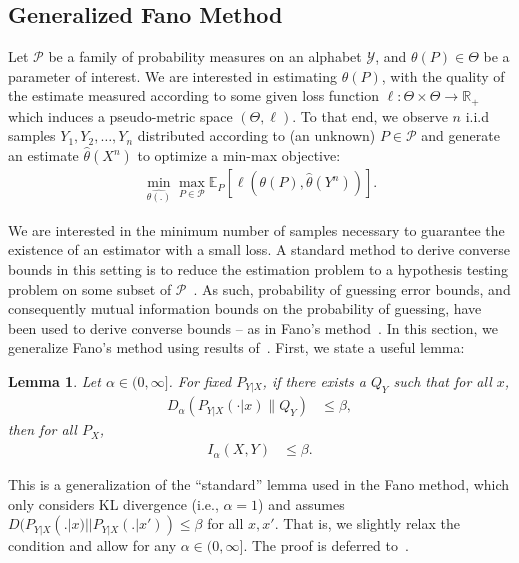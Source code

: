 \documentclass{article}
\numberwithin{theorem}{section}
\newtheorem{lemma}[theorem]{Lemma}
\numberwithin{example}{section}
\numberwithin{remark}{section}
\numberwithin{definition}{section}
\newcommand{\E}{\mathbb{E}}
\newcommand{\Y}{\mathcal{Y}}
\newcommand{\cP}{\mathcal{P}}
\begin{document}
 
\subsection{Generalized Fano Method}\label{sec:fanoMethodSibson}

Let $\cP$ be a family of probability measures on an alphabet $\Y$, and $\theta(P) \in \Theta$ be a parameter of interest. We are interested in estimating $\theta(P)$, with the quality of the estimate measured according to some given loss function $\ell: \Theta \times \Theta \rightarrow \mathbb{R}_+$ which induces a pseudo-metric space $(\Theta,\ell)$.  To that end, we observe $n$ i.i.d samples $Y_1, Y_2, \ldots, Y_n$ distributed according to (an unknown) $P \in \cP$ and generate an estimate $\hat{\theta}(X^n)$ to optimize a min-max objective:
\begin{align}
    \min_{ \hat{\theta(.)}} \max_{P \in \cP} \E_P \left[ \ell(\theta(P), \hat\theta(Y^n)) \right].
\end{align}

We are interested in the minimum number of samples necessary to guarantee the existence of an estimator with a small loss. A standard method to derive converse bounds in this setting is to reduce the estimation problem to a hypothesis testing problem on some subset of $\cP$~\cite{lecam:1973,assouad:1983,yu:1997}. As such, probability of guessing error bounds, and consequently mutual information bounds on the probability of guessing, have been used to derive converse bounds -- as in Fano's method~\cite{fano:1952,yu:1997}. In this section, we generalize Fano's method using results of~. First, we state a useful lemma:

\begin{lemma} \label{lem:Dalpha-bound-Ialpha}
Let $\alpha \in (0, \infty]$. For fixed $P_{Y|X}$, if there exists a $Q_Y$ such that for all $x$,
\begin{align}
    D_{\alpha} \left(P_{Y|X}(\cdot|x) \| Q_Y \right) &\le \beta,
\end{align}
then for all $P_X$,
\begin{align}
    I_{\alpha}(X,Y) & \le \beta.
\end{align}
\end{lemma}
This is a generalization of the ``standard'' lemma used in the Fano method, which only considers KL divergence (i.e., $\alpha=1$) and assumes $D(P_{Y|X}(.|x) || P_{Y|X}(.|x')) \leq \beta$ for all $x,x'$. That is, we slightly relax the condition and allow for any $\alpha \in (0,\infty]$. The proof is deferred to~.
\end{document}
